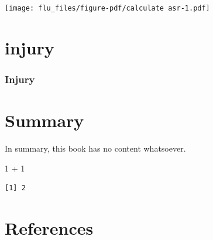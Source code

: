 \documentclass[
  letterpaper,
  DIV=11,
  numbers=noendperiod]{scrreprt}
\newenvironment{Shaded}{\begin{snugshade}}{\end{snugshade}}
\newcommand{\DecValTok}[1]{\textcolor[rgb]{0.68,0.00,0.00}{#1}}
\newcommand{\SpecialCharTok}[1]{\textcolor[rgb]{0.37,0.37,0.37}{#1}}
\newlength{\cslhangindent}
\newenvironment{CSLReferences}[2] %
 {\begin{list}{}{%
  \setlength{\itemindent}{0pt}
  \setlength{\leftmargin}{0pt}
  \setlength{\parsep}{0pt}
  \ifodd #1
   \setlength{\leftmargin}{\cslhangindent}
   \setlength{\itemindent}{-1\cslhangindent}
  \fi
  \setlength{\itemsep}{#2\baselineskip}}}
 {\end{list}}
\begin{document}
\texttt{[image: flu\_files/figure-pdf/calculate asr-1.pdf]}


\chapter{injury}\label{injury}

\subsection{Injury}\label{injury-1}


\chapter{Summary}\label{summary}

In summary, this book has no content whatsoever.

\begin{Shaded}
\begin{Highlighting}[]
\DecValTok{1} \SpecialCharTok{+} \DecValTok{1}
\end{Highlighting}
\end{Shaded}

\begin{verbatim}
[1] 2
\end{verbatim}


\chapter*{References}\label{references}


\label{refs}
\begin{CSLReferences}{0}{1}
\end{CSLReferences}
\end{document}

